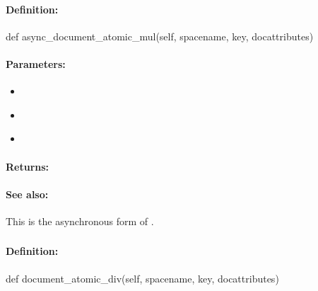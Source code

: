 \paragraph{Definition:}
\begin{pythoncode}
def async_document_atomic_mul(self, spacename, key, docattributes)
\end{pythoncode}

\paragraph{Parameters:}
\begin{itemize}[noitemsep]
\item {}\\

\item {}\\

\item {}\\

\end{itemize}

\paragraph{Returns:}


\paragraph{See also:}  This is the asynchronous form of .

\pagebreak
\subsubsection{}
\label{api:python:document_atomic_div}


\paragraph{Definition:}
\begin{pythoncode}
def document_atomic_div(self, spacename, key, docattributes)
\end{pythoncode}

